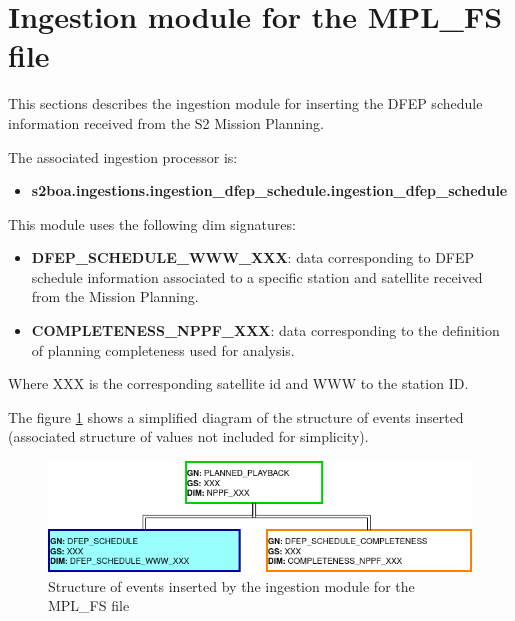 \section{Ingestion module for the MPL\_FS file}

This sections describes the ingestion module for inserting the DFEP schedule information received from the S2 Mission Planning.

The associated ingestion processor is:

\begin{itemize} 

\item \textbf{s2boa.ingestions.ingestion\_dfep\_schedule.ingestion\_dfep\_schedule}
  
\end{itemize}

This module uses the following \acrshort{dim} signatures:

\begin{itemize} 

\item \textbf{DFEP\_SCHEDULE\_WWW\_XXX}: data corresponding to DFEP schedule information associated to a specific station and satellite received from the Mission Planning.

\item \textbf{COMPLETENESS\_NPPF\_XXX}: data corresponding to the definition of planning completeness used for analysis.
  
\end{itemize}

Where XXX is the corresponding satellite id and WWW to the station ID.

The figure \ref{fg:structure_ingestion_dfep_schedule} shows a simplified diagram of the structure of events inserted (associated structure of values not included for simplicity).

\begin{figure}[H]
  \begin{center}
	\centering\includegraphics[width=150mm]{../fig/structure_ingestion_dfep_schedule.png}
	\caption{Structure of events inserted by the ingestion module for the MPL\_FS file}
	\label{fg:structure_ingestion_dfep_schedule}
  \end{center}
\end{figure}

